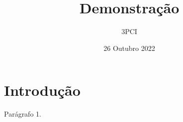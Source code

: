 \documentclass{article}
\title{Demonstração}
\author{3PCI}
\date{26 Outubro 2022}
\begin{document}
\maketitle

\section{Introdução}

Parágrafo 1.
\end{document}
